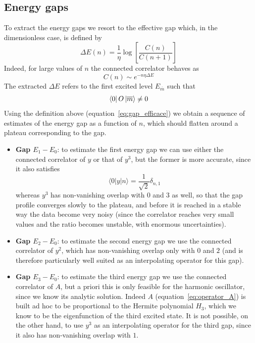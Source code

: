 \documentclass[10pt,a4paper]{article}
\begin{document}
\subsection{Energy gaps}
To extract the energy gaps we resort to the effective gap which, in the
dimensionless case, is defined by
\begin{equation}
    \Delta E(n) = \frac{1}{\eta} \log\left[\frac{C(n)}{C(n+1)}\right]
    \label{eq:gap_efficace}
\end{equation}
Indeed, for large values of $n$ the connected correlator behaves as
\begin{equation}
    C(n) \sim e^{-n \eta \Delta E }
    \label{eq:corr_asymptotic}
\end{equation}
The extracted $\Delta E$ refers to the first excited level $E_{\overline{m}}$ such
that
\begin{equation}
    \bra{0} O \ket{\overline{m}} \neq 0
    \label{eq:selection_rule}
\end{equation}
Using the definition above (equation~\ref{eq:gap_efficace}) we obtain a sequence of
estimates of the energy gap as a function of $n$, which should flatten around a
plateau corresponding to the gap.

\begin{itemize}
    \item \textbf{Gap $E_1 - E_0$}: to estimate the first energy gap we can use
    either the connected correlator of $y$ or that of $y^3$, but the former is more
    accurate, since it also satisfies
\begin{equation}
    \langle 0 | y | n \rangle = \frac{1}{\sqrt{2}} \delta_{n,1}
    \label{eq:y_matrix_element}
\end{equation}
whereas $y^3$ has non-vanishing overlap with $0$ and $3$ as well, so that the gap
profile converges slowly to the plateau, and before it is reached in a stable way
the data become very noisy (since the correlator reaches very small values and the
ratio becomes unstable, with enormous uncertainties).
    \item \textbf{Gap $E_2 - E_0$}: to estimate the second energy gap we use the
    connected correlator of $y^2$, which has non-vanishing overlap only with $0$ and
    $2$ (and is therefore particularly well suited as an interpolating operator for
    this gap).
    \item \textbf{Gap $E_3 - E_0$}: to estimate the third energy gap we use the
    connected correlator of $A$, but a priori this is only feasible for the harmonic
    oscillator, since we know its analytic solution. Indeed $A$
    (equation~\ref{eq:operator_A}) is built ad hoc to be proportional to the Hermite
    polynomial $H_3$, which we know to be the eigenfunction of the third excited
    state. It is not possible, on the other hand, to use $y^3$ as an interpolating
    operator for the third gap, since it also has non-vanishing overlap with $1$.

\end{itemize}
\end{document}
